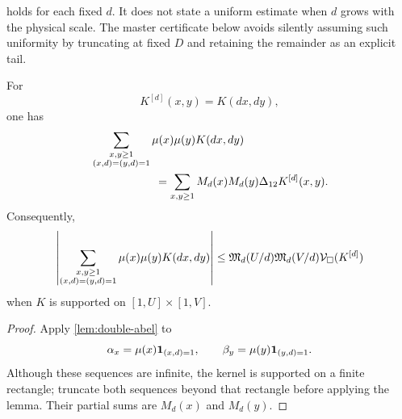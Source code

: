 \begin{remark}
 holds for each fixed \(d\).  It does not state
a uniform estimate when \(d\) grows with the physical scale.  The master
certificate below avoids silently assuming such uniformity by truncating at
fixed \(D\) and retaining the remainder as an explicit tail.
\end{remark}

\begin{proposition}
\label{prop:one-diagonal-abel}
For
\[
 K^{[d]}(x,y)=K(dx,dy),
\]
one has
\begin{align}
 &\sum_{\substack{x,y\ge1\\(x,d)=(y,d)=1}}
 \mu(x)\mu(y)K(dx,dy)
\notag\\
 &\hspace{2cm}=
 \sum_{x,y\ge1}
 M_d(x)M_d(y)\Delta_{12}K^{[d]}(x,y).
\label{eq:one-diagonal-abel}
\end{align}
Consequently,
\begin{equation}
 \left|
 \sum_{\substack{x,y\ge1\\(x,d)=(y,d)=1}}
 \mu(x)\mu(y)K(dx,dy)
 \right|
 \le
 \mathfrak M_d(U/d)\mathfrak M_d(V/d)
 \mathcal V_\square(K^{[d]})
\label{eq:one-diagonal-bound}
\end{equation}
when \(K\) is supported on \([1,U]\times[1,V]\).
\end{proposition}

\begin{proof}
Apply \cref{lem:double-abel} to
\[
 \alpha_x=\mu(x)\mathbf 1_{(x,d)=1},
 \qquad
 \beta_y=\mu(y)\mathbf 1_{(y,d)=1}.
\]
Although these sequences are infinite, the kernel is supported on a finite
rectangle; truncate both sequences beyond that rectangle before applying
the lemma.
Their partial sums are \(M_d(x)\) and \(M_d(y)\).
\end{proof}
